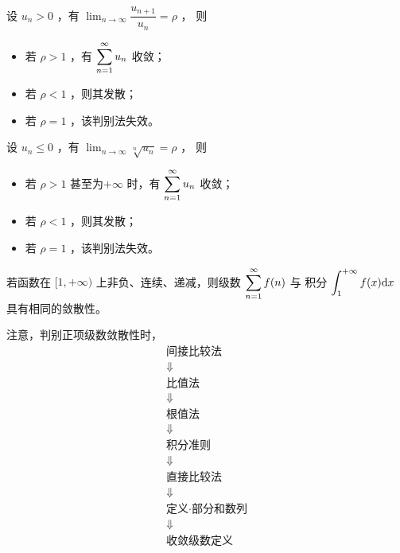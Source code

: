 \begin{Theo}[比值判别法]

    设 $ u_n > 0 $ ，有 $ {\displaystyle\lim_{n\rightarrow \infty}}\dfrac{u_{n+1}}{u_{n}} = \rho $ ，
    则\begin{itemize}
        \item 若 $ \rho > 1 $ ，有 $\displaystyle \sum_{n=1}^{\infty}u_n $ 收敛；
        \item 若 $ \rho < 1 $ ，则其发散；
        \item 若 $ \rho = 1 $ ，该判别法失效。
    \end{itemize}
\end{Theo}

\begin{Theo}[根值判别法]

    设 $ u_n \leq 0 $ ，有 $ {\displaystyle\lim_{n\rightarrow \infty}}\sqrt[n]{u_n} = \rho $ ，
    则\begin{itemize}
        \item 若 $ \rho > 1 $ 甚至为$ +\infty $ 时，有 $\displaystyle \sum_{n=1}^{\infty}u_n $ 收敛；
        \item 若 $ \rho < 1 $ ，则其发散；
        \item 若 $ \rho = 1 $ ，该判别法失效。
    \end{itemize}
\end{Theo}

\begin{Theo}[积分准则]

    若函数在 $ [1,+\infty) $ 上非负、连续、递减，则级数 $\displaystyle \sum_{n=1}^{\infty}f(n) $ 与
    积分 $ \displaystyle \int_1^{+\infty}f(x)\mathrm{d}x $ 具有相同的敛散性。
\end{Theo}

注意，判别正项级数敛散性时，\begin{equation*}
    \begin{matrix}
        \textrm{间接比较法} \\\Downarrow\\ 
        \textrm{比值法}\\\Downarrow\\
         \textrm{根值法}\\\Downarrow\\
          \textrm{积分准则}\\\Downarrow\\
        \textrm{直接比较法}\\\Downarrow\\
         \textrm{定义·部分和数列}\\\Downarrow\\
          \textrm{收敛级数定义}
    \end{matrix}
\end{equation*}

